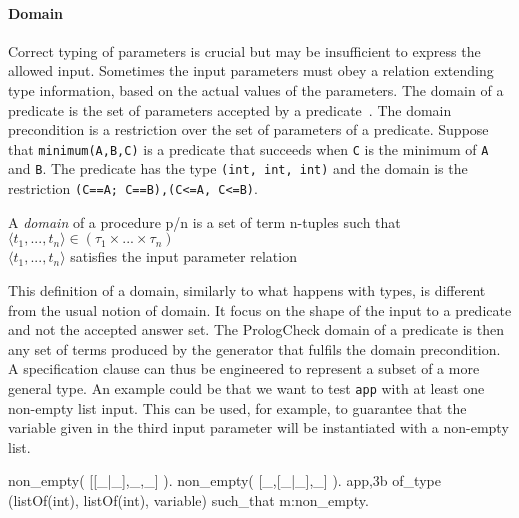\documentclass[runningheads,a4paper]{../../PaperStyles/llncs}
\newcommand{\yap}[1]{\lstinline[style=yap]{#1}}
\newcommand{\todo}[2][?]{\marginpar{\raggedright \tiny TODO: #2}}
\newcommand{\plqc}[0]{{\sf PrologCheck}}
\begin{document}
\paragraph{\bf Domain}

Correct typing of parameters is crucial but may be insufficient to
express the allowed input.
%
Sometimes the input parameters must obey a relation extending type information,
based on the actual values of the parameters.
%
The domain of a predicate is the set of parameters accepted by a
predicate~\cite{Deville1990logprog}.
%
The domain precondition is a restriction over the set of parameters of a
predicate.
%
Suppose that \yap{minimum(A,B,C)} is a predicate that succeeds when
\yap{C} is the minimum of \yap{A} and \yap{B}.
%
The predicate has the type \yap{(int, int, int)} and the domain is the
restriction \yap{(C==A; C==B),(C<=A, C<=B)}.


\begin{definition}
\label{def:domain}
A {\em domain} of a procedure p/n is a set of term
n-tuples such that\\
\qquad $\langle t_1,...,t_n \rangle \in (\tau_1 \times ... \times
\tau_n)$\\
\qquad $\langle t_1,...,t_n \rangle$ satisfies the input parameter relation
\end{definition}


This definition of a domain, similarly to what happens with types, is
different from the usual notion of domain.
%
It focus on the shape of the input to a predicate and not the accepted
answer set.
%
The \plqc{} domain of a predicate is then any set of terms produced by
the generator that fulfils the domain precondition.
%
%
A specification clause can thus be engineered to represent a subset of
a more general type.
%
An example could be that we want to test \yap{app} with at least one
non-empty list input.
%
This can be used, for example, to guarantee that the variable given in
the third input parameter will be instantiated with a non-empty list.
\begin{yapcode}
 non_empty( [[_|_],_,_] ).
 non_empty( [_,[_|_],_] ).
 {app,3b} of_type (listOf(int), listOf(int), variable)
    such_that m:non_empty.
\end{yapcode}
\end{document}
